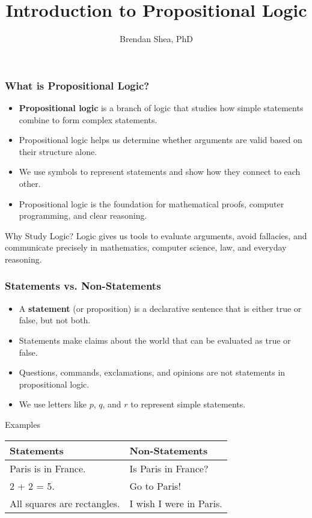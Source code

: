 \documentclass{beamer}
\title{Introduction to Propositional Logic}
\author{Brendan Shea, PhD}
\begin{document}
\begin{frame}
\titlepage
\end{frame}

\begin{frame}
\frametitle{What is Propositional Logic?}
\begin{itemize}
    \item \textbf{Propositional logic} is a branch of logic that studies how simple statements combine to form complex statements.
    \item Propositional logic helps us determine whether arguments are valid based on their structure alone.
    \item We use symbols to represent statements and show how they connect to each other.
    \item Propositional logic is the foundation for mathematical proofs, computer programming, and clear reasoning.
\end{itemize}

\begin{alertblock}{Why Study Logic?}
    Logic gives us tools to evaluate arguments, avoid fallacies, and communicate precisely in mathematics, computer science, law, and everyday reasoning.
\end{alertblock}
\end{frame}

\begin{frame}
\frametitle{Statements vs. Non-Statements}
\begin{itemize}
    \item A \textbf{statement} (or proposition) is a declarative sentence that is either true or false, but not both.
    \item Statements make claims about the world that can be evaluated as true or false.
    \item Questions, commands, exclamations, and opinions are not statements in propositional logic.
    \item We use letters like $p$, $q$, and $r$ to represent simple statements.
\end{itemize}

\begin{block}{Examples}
\begin{tabular}{ll}
\textbf{Statements} & \textbf{Non-Statements} \\
\hline
Paris is in France. & Is Paris in France? \\
2 + 2 = 5. & Go to Paris! \\
All squares are rectangles. & I wish I were in Paris. \\
\end{tabular}
\end{block}
\end{frame}
\end{document}
